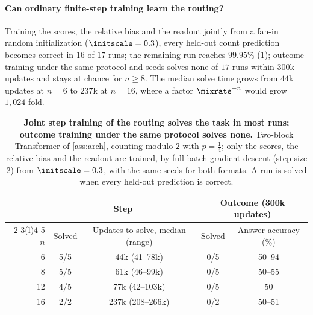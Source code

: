 \paragraph{Can ordinary finite-step training learn the routing?} Training the scores, the relative bias and the readout jointly from a fan-in
random initialization ($\initscale=0.3$), every held-out count prediction becomes correct in $16$ of $17$ runs; the
remaining run reaches $99.95\%$ (\cref{tab:reach}); outcome training under the same protocol and seeds solves none of $17$
runs within $300$k updates and stays at chance for $n\ge8$. The median solve time grows from $44$k updates at $n=6$ to $237$k at
$n=16$, where a factor $\mixrate^{-n}$ would grow $1{,}024$-fold.

\begin{table}[t]
\caption{\textbf{Joint step training of the routing solves the task in most runs; outcome training under the same protocol solves
none.} Two-block Transformer of \cref{ass:arch}, counting modulo $2$ with $p=\tfrac{1}{4}$; only the scores, the relative bias and the
readout are trained, by full-batch gradient descent (step size $2$) from $\initscale=0.3$, with the same seeds for both formats. A run is
solved when every held-out prediction is correct.}
\label{tab:reach}
\centering\small
\begin{tabular}{@{}rcccc@{}}
\toprule
 & \multicolumn{2}{c}{Step} & \multicolumn{2}{c}{Outcome (300k updates)}\\
\cmidrule(lr){2-3}\cmidrule(l){4-5}
$n$ & Solved & Updates to solve, median (range) & Solved & Answer accuracy (\%)\\
\midrule
6  & 5/5 & 44k (41--78k)   & 0/5 & 50--94\\
8  & 5/5 & 61k (46--99k)   & 0/5 & 50--55\\
12 & 4/5 & 77k (42--103k)  & 0/5 & 50\\
16 & 2/2 & 237k (208--266k) & 0/2 & 50--51\\
\bottomrule
\end{tabular}
\end{table}

